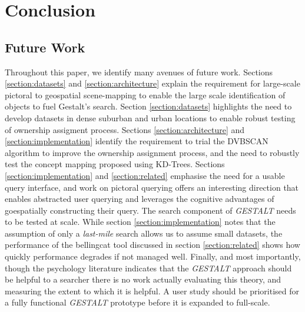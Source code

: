 \section{Conclusion}
\label{section:conlusion}

\subsection{Future Work}
Throughout this paper, we identify many avenues of future work. Sections \ref{section:datasets} and \ref{section:architecture} explain the requirement for large-scale pictoral to geospatial scene-mapping to enable the large scale identification of objects to fuel Gestalt's search. 
Section \ref{section:datasets} highlights the need to develop datasets in dense suburban and urban locations to enable robust testing of ownership assigment process. 
Sections \ref{section:architecture} and \ref{section:implementation} identify the requirement to trial the DVBSCAN algorithm to improve the ownership assignment process, and the need to robustly test the concept mapping proposed using KD-Trees.
Sections \ref{section:implementation} and \ref{section:related} emphasise the need for a usable query interface, and work on pictoral querying offers an interesting direction that enables abstracted user querying and leverages the cognitive advantages of goespatially constructing their query. 
The search component of \textit{GESTALT} needs to be tested at scale. While section \ref{section:implementation} notes that the assumption of only a \textit{last-mile} search allows us to assume small datasets, the performance of the bellingcat tool discussed in section \ref{section:related} shows how quickly performance degrades if not managed well.
Finally, and most importantly, though the psychology literature indicates that the \textit{GESTALT} approach should be helpful to a searcher there is no work actually evaluating this theory, and measuring the extent to which it is helpful. A user study should be prioritised for a fully functional \textit{GESTALT} prototype before it is expanded to full-scale.

